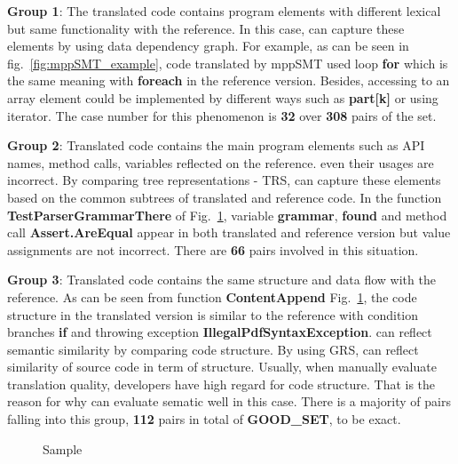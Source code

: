 \begin{compactitem}
\item {\bf Group 1}: The translated code contains program elements with different lexical but same functionality with the reference. In this case, {\model} can capture these elements by using data dependency graph. For example, as can be seen in fig.~\ref{fig:mppSMT_example}, code translated by mppSMT used loop \textbf{for} which is the same meaning with \textbf{foreach} in the reference version. Besides, accessing to an array element could be implemented by  different ways such as \textbf{part[k]} or using iterator. The case number for this phenomenon is \textbf{32} over \textbf{308} pairs of the set.

\item {\bf Group 2}: Translated code contains the main program elements such as API names, method calls, variables reflected on the reference. even their usages are incorrect. By comparing tree representations - TRS, {\model} can capture these elements based on the common subtrees of translated and reference code. In the function \textbf{TestParserGrammarThere} of Fig.~\ref{fig:samples}, variable \textbf{grammar}, \textbf{found} and method call \textbf{Assert.AreEqual} appear in both translated and reference version but value assignments are not incorrect. There are \textbf{66} pairs involved in this situation.

\item {\bf Group 3}: Translated code contains the same structure and data flow with the reference. As can be seen from function \textbf{ContentAppend} Fig.~\ref{fig:samples}, the code structure in the translated version is similar to the reference with condition branches \textbf{if} and throwing exception \textbf{IllegalPdfSyntaxException}. {\model} can reflect semantic similarity by comparing code structure. By using GRS, {\model} can reflect similarity of source code in term of structure. Usually, when manually evaluate translation quality, developers have high regard for code structure. That is the reason for why {\model} can evaluate sematic well in this case. There is a majority of pairs falling into this group,  \textbf{112} pairs in total of \textbf{GOOD\_SET}, to be exact.
\end{compactitem}



\begin{figure}[t]
	\centering
	
	\caption{Sample}
	\label{fig:samples}
\end{figure}

